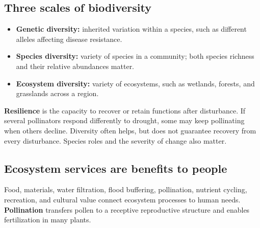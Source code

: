 \documentclass[11pt,letterpaper]{article}
\newcommand{\ico}[3][forest]{{\fontsize{#3}{#3}\selectfont\textcolor{#1}{#2}}}
\newcommand{\pn}[3]{\ico[#1]{#2}{19pt}\\[2pt]#3}
\begin{document}
\subsection*{Three scales of biodiversity}
\begin{itemize}
\item \textbf{Genetic diversity:} inherited variation within a species, such as different alleles affecting disease resistance.
\item \textbf{Species diversity:} variety of species in a community; both species richness and their relative abundances matter.
\item \textbf{Ecosystem diversity:} variety of ecosystems, such as wetlands, forests, and grasslands across a region.
\end{itemize}
\textbf{Resilience} is the capacity to recover or retain functions after disturbance. If several pollinators respond differently to drought, some may keep pollinating when others decline. Diversity often helps, but does not guarantee recovery from every disturbance. Species roles and the severity of change also matter.
\begin{center}
\par
\end{center}
\subsection*{Ecosystem services are benefits to people}
Food, materials, water filtration, flood buffering, pollination, nutrient cycling, recreation, and cultural value connect ecosystem processes to human needs. \textbf{Pollination} transfers pollen to a receptive reproductive structure and enables fertilization in many plants.
\end{document}
